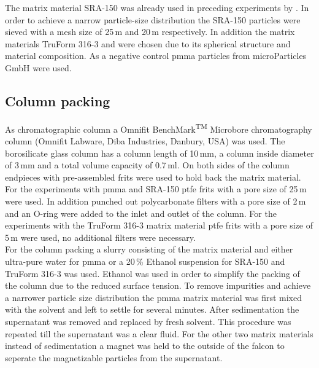 The matrix material SRA-150 was already used in preceding experiments by \cite{AndreMaster}. In order to achieve a narrow particle-size distribution the SRA-150 particles were sieved with a mesh size of 25\,\textmu m and 20\,\textmu m respectively. In addition the matrix materials TruForm 316-3 and were chosen due to its spherical structure and material composition. 
As a negative control \gls{pmma} particles from microParticles GmbH were used. 

\subsection{Column packing}
\label{subsec:col_pack}
As chromatographic column a Omnifit\textsuperscript{\textregistered} BenchMark\textsuperscript{TM} Microbore chromatography column (Omnifit Labware, Diba Industries, Danbury, USA) was used. The borosilicate glass column has a column length of 10\,mm, a column inside diameter of 3\,mm and a total volume capacity of 0.7\,ml. On both sides of the column endpieces with pre-assembled frits were used to hold back the matrix material. For the experiments with \gls{pmma} and SRA-150 \gls{ptfe} frits with a pore size of 25\,\textmu m were used. In addition punched out polycarbonate filters with a pore size of 2\,\textmu m and an O-ring were added to the inlet and outlet of the column. For the experiments with the TruForm 316-3 matrix material \gls{ptfe} frits with a pore size of 5\,\textmu m were used, no additional filters were necessary. \\   
For the column packing a slurry consisting of the matrix material and either ultra-pure water for \gls{pmma} or a 20\,\% Ethanol suspension for SRA-150 and TruForm 316-3 was used. Ethanol was used in order to simplify the packing of the column due to the reduced surface tension. To remove impurities and achieve a narrower particle size distribution the \gls{pmma} matrix material was first mixed with the solvent and left to settle for several minutes. After sedimentation the supernatant was removed and replaced by fresh solvent. This procedure was repeated till the supernatant was a clear fluid. For the other two matrix materials instead of sedimentation a magnet was held to the outside of the falcon to seperate the magnetizable particles from the supernatant.\\   
